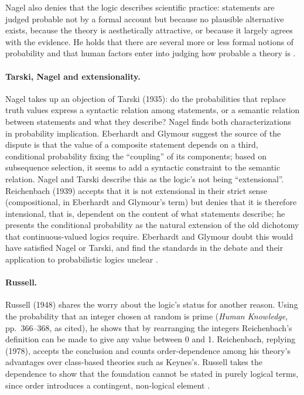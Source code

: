 Nagel also denies that the logic describes scientific practice:
statements are judged probable not by a formal account but because no
plausible alternative exists, because the theory is aesthetically
attractive, or because it largely agrees with the evidence. He holds that
there are several more or less formal notions of probability and that
human factors enter into judging how probable a theory is
\cite[p.~380]{EberhardtGlymour2011ReichenbachReading}.

\paragraph{Tarski, Nagel and extensionality.} Nagel takes up an
objection of Tarski (1935): do the probabilities that replace truth
values express a syntactic relation among statements, or a semantic
relation between statements and what they describe? Nagel finds both
characterizations in probability implication. Eberhardt and Glymour suggest the
source of the dispute is that the value of a composite statement depends
on a third, conditional probability fixing the ``coupling'' of its
components; based on subsequence selection, it seems to add a syntactic
constraint to the semantic relation. Nagel and Tarski describe this as
the logic's not being ``extensional''. Reichenbach (1939) accepts that it
is not extensional in their strict sense (compositional, in Eberhardt and Glymour's
term) but denies that it is therefore intensional, that is, dependent on
the content of what statements describe; he presents the conditional
probability as the natural extension of the old dichotomy that
continuous-valued logics require. Eberhardt and Glymour doubt this would have
satisfied Nagel or Tarski, and find the standards in the debate and their
application to probabilistic logics unclear
\cite[pp.~380--381 and n.~15]{EberhardtGlymour2011ReichenbachReading}.

\paragraph{Russell.} Russell (1948) shares the worry about the logic's
status for another reason. Using the probability that an integer chosen
at random is prime (\emph{Human Knowledge}, pp.~366--368, as cited), he
shows that by rearranging the integers Reichenbach's definition can be
made to give any value between 0 and 1. Reichenbach, replying (1978),
accepts the conclusion and counts order-dependence among his theory's
advantages over class-based theories such as Keynes's. Russell takes the
dependence to show that the foundation cannot be stated in purely logical
terms, since order introduces a contingent, non-logical element
\cite[p.~381]{EberhardtGlymour2011ReichenbachReading}.

